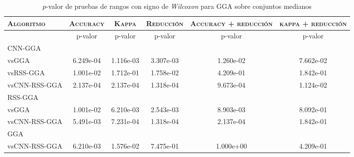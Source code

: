 \begin{table}[h!]
\centering
\begin{adjustbox}{max width =\textwidth}
\begin{tabular}{l c c c c c}
\hline
	\textsc{Algoritmo}
	& \multicolumn{1}{c}{\textsc{Accuracy}}
	& \multicolumn{1}{c}{\textsc{Kappa}}
	& \multicolumn{1}{c}{\textsc{Reducción}} 
	& \multicolumn{1}{c}{\textsc{Accuracy + reducción}} 
	& \multicolumn{1}{c}{\textsc{kappa + reducción}} \\
\hline
\hline

 & p-valor & p-valor & p-valor & p-valor & p-valor \\

CNN-GGA\\
vsGGA & 6.249e-04 & 1.116e-03 & 3.307e-03 & 1.260e-02 & 7.662e-02 \\ 
vsRSS-GGA & 1.001e-02 & 1.712e-01 & 1.758e-02 & 4.209e-01 & 1.842e-01 \\ 
vsCNN-RSS-GGA & 2.137e-04 & 2.137e-04 & 1.318e-04 & 9.673e-04 & 1.124e-02 \\
 
\hline

RSS-GGA\\
vsGGA & 1.001e-02 & 6.210e-03 & 2.543e-03 & 8.903e-03 & 8.092e-01 \\ 
vsCNN-RSS-GGA & 5.491e-03 & 7.231e-04 & 1.318e-04 & 2.137e-04 & 1.842e-01 \\

\hline

GGA\\
vsCNN-RSS-GGA & 6.210e-03 & 1.576e-02 & 7.475e-01 & 1.000e+00 & 4.209e-01 \\ 

\hline

\end{tabular}
\end{adjustbox}
\caption[Pruebas de \emph{Wilcoxon} entre GGA y variaciones para conjuntos medianos]{$p$-valor de pruebas de rangos con signo de \emph{Wilcoxon} para GGA sobre conjuntos medianos}
\label{wilcox-gga-med}
\end{table}

